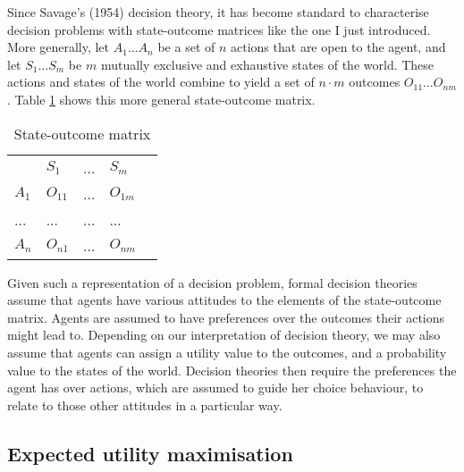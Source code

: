 Since Savage's (1954) decision theory, it has become standard to characterise decision problems with state-outcome matrices like the one I just introduced. More generally, let $A_{1} \ldots A_{n}$ be a set of $n$ actions that are open to the agent, and let $S_{1} \ldots S_{m}$ be $m$ mutually exclusive and exhaustive states of the world. These actions and states of the world combine to yield a set of $n \cdot m$ outcomes $O_{11} \ldots O_{nm}$. Table \ref{t2} shows this more general state-outcome matrix.

\begin{table}[ht]
\centering
\begin{tabular}{l|l|l|l|l}
\cline{2-4}
                          & $S_{1}$  & ... & $S_{m}$  &  \\ \cline{1-4}
\multicolumn{1}{|l|}{$A_{1}$}  &$ O_{11}$ & ... & $O_{1m}$ &   \\ \cline{1-4}
\multicolumn{1}{|l|}{...} & ... & ... & ... &   \\ \cline{1-4}
\multicolumn{1}{|l|}{$A_{n}$}  & $O_{n1}$ & ... & $O_{nm}$ &   \\ \cline{1-4}
\end{tabular}
\caption{State-outcome matrix}
\label{t2}
\end{table}

Given such a representation of a decision problem, formal decision theories assume that agents have various attitudes to the elements of the state-outcome matrix. Agents are assumed to have preferences over the outcomes their actions might lead to. Depending on our interpretation of decision theory, we may also assume that agents can assign a utility value to the outcomes, and a probability value to the states of the world. Decision theories then require the preferences the agent has over actions, which are assumed to guide her choice behaviour, to relate to those other attitudes in a particular way.

\subsection{Expected utility maximisation}\label{subs12}

